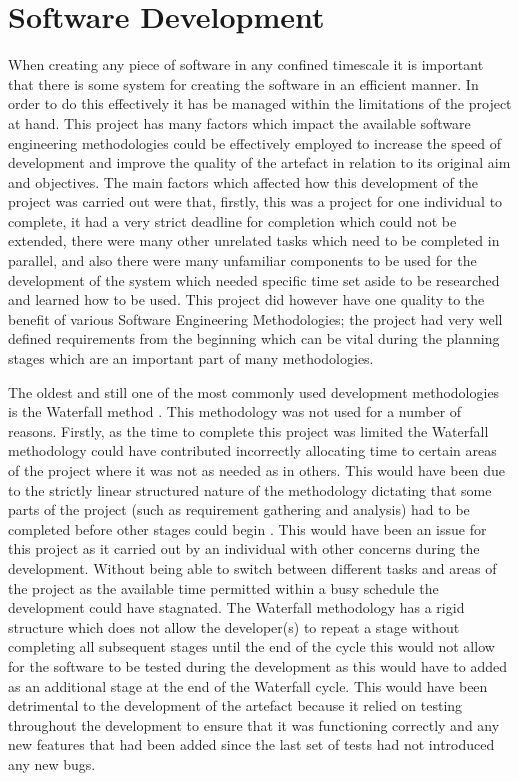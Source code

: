 \documentclass[11pt,a4paper]{report}
\begin{document}
\section{Software Development}%
When creating any piece of software in any confined timescale it is important that there is some system for creating the software in an efficient manner. In order to do this effectively it has be managed within the limitations of the project at hand. This project has many factors which impact the available software engineering methodologies could be effectively employed to increase the speed of development and improve the quality of the artefact in relation to its original aim and objectives. The main factors which affected how this development of the project was carried out were that, firstly, this was a project for one individual to complete, it had a very strict deadline for completion which could not be extended, there were many other unrelated tasks which need to be completed in parallel, and also there were many unfamiliar components to be used for the development of the system which needed specific time set aside to be researched and learned how to be used. This project did however have one quality to the benefit of various Software Engineering Methodologies; the project had very well defined requirements from the beginning which can be vital during the planning stages which are an important part of many methodologies.

The oldest and still one of the most commonly used development methodologies is the Waterfall method \citep{shaydulin2017agile}. This methodology was not used for a number of reasons. Firstly, as the time to complete this project was limited the Waterfall methodology could have contributed incorrectly allocating time to certain areas of the project where it was not as needed as in others. This would have been due to the strictly linear structured nature of the methodology dictating that some parts of the project (such as requirement gathering and analysis) had to be completed before other stages could begin \citep{shaydulin2017agile}. This would have been an issue for this project as it carried out by an individual with other concerns during the development. Without being able to switch between different tasks and areas of the project as the available time permitted within a busy schedule the development could have stagnated. The Waterfall methodology has a rigid structure which does not allow the developer(s) to repeat a stage without completing all subsequent stages until the end of the cycle \citep{WaterfallPresentation} this would not allow for the software to be tested during the development as this would have to added as an additional stage at the end of the Waterfall cycle. This would have been detrimental to the development of the artefact because it relied on testing throughout the development to ensure that it was functioning correctly and any new features that had been added since the last set of tests had not introduced any new bugs.
\end{document}
